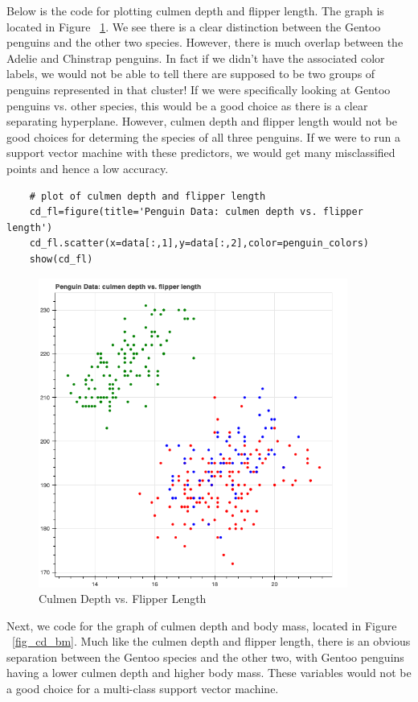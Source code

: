 \documentclass[12pt]{article}
\begin{document}
Below is the code for plotting culmen depth and flipper length. The graph is located in Figure ~\ref{fig_cd_fl}. We see there is a clear distinction between the Gentoo penguins and the other two species. However, there is much overlap between the Adelie and Chinstrap penguins. In fact if we didn't have the associated color labels, we would not be able to tell there are supposed to be two groups of penguins represented in that cluster! If we were specifically looking at Gentoo penguins vs. other species, this would be a good choice as there is a clear separating hyperplane. However, culmen depth and flipper length would not be good choices for determing the species of all three penguins. If we were to run a support vector machine with these predictors, we would get many misclassified points and hence a low accuracy.

\begin{verbatim}
    # plot of culmen depth and flipper length
    cd_fl=figure(title='Penguin Data: culmen depth vs. flipper length')
    cd_fl.scatter(x=data[:,1],y=data[:,2],color=penguin_colors)
    show(cd_fl)
\end{verbatim}

\begin{figure}[H]
    \centering
    \includegraphics[width=4in]{Figures/penguins/cd_fl.png}
    \caption{Culmen Depth vs. Flipper Length}
    \label{fig_cd_fl}
\end{figure}

Next, we code for the graph of culmen depth and body mass, located in Figure ~\ref{fig_cd_bm}. Much like the culmen depth and flipper length, there is an obvious separation between the Gentoo species and the other two, with Gentoo penguins having a lower culmen depth and higher body mass. These variables would not be a good choice for a multi-class support vector machine.
\end{document}
